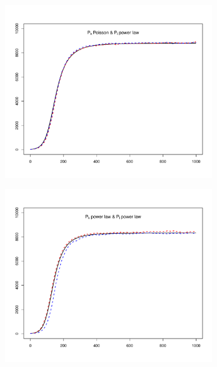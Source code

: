 \begin{figure}[hbtp]
\begin{subfigure}[b]{0.45\textwidth}
    \end{subfigure}
    \newline
    \begin{subfigure}[b]{0.45\textwidth}
        \centering
        \includegraphics[width=\textwidth, trim=30 20 30 20, clip]{../img/sis_01.pdf}
    \end{subfigure}
    \hspace{0.08\textwidth}
    \begin{subfigure}[b]{0.45\textwidth}
        \centering
        \includegraphics[width=\textwidth, trim=30 20 30 20, clip]{../img/sis_11.pdf}

\end{subfigure}
\end{figure}
